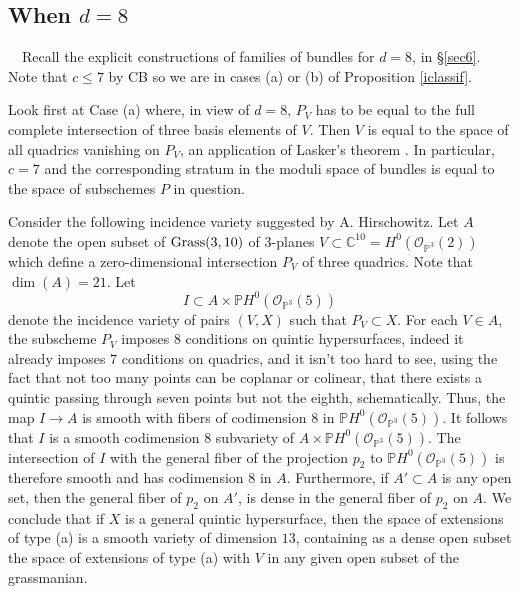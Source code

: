 \documentclass{amsart}
\theoremstyle{plain}
\numberwithin{equation}{section}
\begin{document}
\subsection{When $d=8$}
$\mbox{ }$
\newline
Recall the explicit constructions of families of bundles for $d=8$, in \S \ref{sec6}. 
Note that $c\leq 7$ by CB so we are in cases (a) or (b) of Proposition \ref{iclassif}.

Look first at Case (a) where, in view of $d=8$, $P_V$
has to be equal to the full complete intersection of three basis elements of $V$.
Then $V$ is equal to the space of all quadrics vanishing on $P_V$, an
application of Lasker's theorem \cite[p. 314]{EisenbudGreenHarris}. 
In particular, $c=7$ and the corresponding stratum in the moduli space of bundles is
equal to the space of subschemes $P$ in question. 

Consider the following incidence variety suggested
by A. Hirschowitz. Let $A$ denote the open subset of ${{\rm Grass}} (3,10)$ of $3$-planes
$V\subset {{\mathbb C}} ^10= H^0({{\mathcal O}} _{{{\mathbb P}} ^3}(2))$ which define a zero-dimensional intersection $P_V$
of three quadrics. Note that $\dim (A)=21$. Let 
$$
I\subset A\times {{\mathbb P}} H^0({{\mathcal O}} _{{{\mathbb P}} ^3}(5))
$$
denote the incidence variety of pairs $(V,X)$ such that $P_V\subset X$.
For each $V\in A$, the subscheme $P_V$ imposes $8$ conditions on quintic hypersurfaces,
indeed it already imposes $7$ conditions on quadrics, and it isn't too hard to
see, using the fact that not too many points can be coplanar or colinear, that
there exists a quintic passing through seven points but not the eighth, schematically.
Thus, the map $I\rightarrow A$ is smooth with fibers of codimension $8$  in
${{\mathbb P}} H^0({{\mathcal O}} _{{{\mathbb P}} ^3}(5))$. It follows that $I$ is a smooth codimension $8$ subvariety
of $A\times {{\mathbb P}} H^0({{\mathcal O}} _{{{\mathbb P}} ^3}(5))$. The intersection of $I$ with the general fiber
of the projection $p_2$ to ${{\mathbb P}} H^0({{\mathcal O}} _{{{\mathbb P}} ^3}(5))$ is therefore smooth and
has codimension $8$ in
$A$. Furthermore, if $A'\subset A$ is any open set, then the general fiber 
of $p_2$ on $A'$, is dense in the general fiber of $p_2$ on $A$. We conclude that if
$X$ is a general quintic hypersurface, then the space of extensions of type (a)
is a smooth variety of dimension $13$, containing as a dense open subset the 
space of extensions of type (a) with $V$ in any given open subset of the 
grassmanian. 
\end{document}
